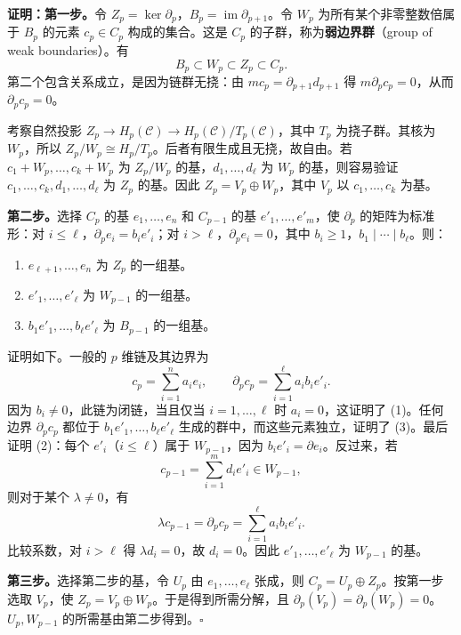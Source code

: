 \noindent\textbf{证明：第一步。}令 $Z_p=\ker\partial_p$，$B_p=\operatorname{im}\partial_{p+1}$。令 $W_p$ 为所有某个非零整数倍属于 $B_p$ 的元素 $c_p\in C_p$ 构成的集合。这是 $C_p$ 的子群，称为\textbf{弱边界群}（group of weak boundaries）。有
\[
B_p\subset W_p\subset Z_p\subset C_p.
\]
第二个包含关系成立，是因为链群无挠：由 $mc_p=\partial_{p+1}d_{p+1}$ 得 $m\partial_pc_p=0$，从而 $\partial_pc_p=0$。

考察自然投影 $Z_p\to H_p(\mathcal C)\to H_p(\mathcal C)/T_p(\mathcal C)$，其中 $T_p$ 为挠子群。其核为 $W_p$，所以 $Z_p/W_p\cong H_p/T_p$。后者有限生成且无挠，故自由。若 $c_1+W_p,\ldots,c_k+W_p$ 为 $Z_p/W_p$ 的基，$d_1,\ldots,d_\ell$ 为 $W_p$ 的基，则容易验证 $c_1,\ldots,c_k,d_1,\ldots,d_\ell$ 为 $Z_p$ 的基。因此 $Z_p=V_p\oplus W_p$，其中 $V_p$ 以 $c_1,\ldots,c_k$ 为基。

\textbf{第二步。}选择 $C_p$ 的基 $e_1,\ldots,e_n$ 和 $C_{p-1}$ 的基 $e'_1,\ldots,e'_m$，使 $\partial_p$ 的矩阵为标准形：对 $i\leq\ell$，$\partial_pe_i=b_i e'_i$；对 $i>\ell$，$\partial_pe_i=0$，其中 $b_i\geq1$，$b_1\mid\cdots\mid b_\ell$。则：
\begin{enumerate}[label=(\arabic*)]
\item $e_{\ell+1},\ldots,e_n$ 为 $Z_p$ 的一组基。
\item $e'_1,\ldots,e'_\ell$ 为 $W_{p-1}$ 的一组基。
\item $b_1e'_1,\ldots,b_\ell e'_\ell$ 为 $B_{p-1}$ 的一组基。
\end{enumerate}
证明如下。一般的 $p$ 维链及其边界为
\[
c_p=\sum_{i=1}^n a_i e_i,\qquad
\partial_pc_p=\sum_{i=1}^\ell a_i b_i e'_i.
\]
因为 $b_i\ne0$，此链为闭链，当且仅当 $i=1,\ldots,\ell$ 时 $a_i=0$，这证明了 (1)。任何边界 $\partial_pc_p$ 都位于 $b_1e'_1,\ldots,b_\ell e'_\ell$ 生成的群中，而这些元素独立，证明了 (3)。最后证明 (2)：每个 $e'_i$（$i\leq\ell$）属于 $W_{p-1}$，因为 $b_i e'_i=\partial e_i$。反过来，若
\[
c_{p-1}=\sum_{i=1}^m d_i e'_i\in W_{p-1},
\]
则对于某个 $\lambda\ne0$，有
\[
\lambda c_{p-1}=\partial_pc_p=\sum_{i=1}^\ell a_i b_i e'_i.
\]
比较系数，对 $i>\ell$ 得 $\lambda d_i=0$，故 $d_i=0$。因此 $e'_1,\ldots,e'_\ell$ 为 $W_{p-1}$ 的基。

\textbf{第三步。}选择第二步的基，令 $U_p$ 由 $e_1,\ldots,e_\ell$ 张成，则 $C_p=U_p\oplus Z_p$。按第一步选取 $V_p$，使 $Z_p=V_p\oplus W_p$。于是得到所需分解，且 $\partial_p(V_p)=\partial_p(W_p)=0$。$U_p,W_{p-1}$ 的所需基由第二步得到。\hfill$\square$

